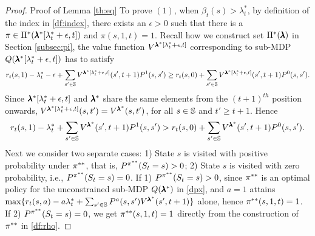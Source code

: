 \section{}\label{ap:eq}
\begin{proof}{Proof of Lemma \ref{th:eq}}
To prove $(1)$, when $\beta_t(s)>\lambda^*_t$, by definition of the index in \eqref{df:index}, there exists an $\epsilon>0$ such that there is a $\pi\in\Pi^{*}(\pmb{\lambda}^*[\lambda_t^*+\epsilon,t])$ and $\pi(s,1,t)=1$. Recall how we construct set $\Pi^*(\pmb{\lambda})$ in Section \ref{subsec:pi}, the value function $V^{\pmb{\lambda}^*[\lambda^*_t+\epsilon,t]}$ corresponding to sub-MDP $Q(\pmb{\lambda}^*[\lambda^*_t+\epsilon,t])$ has to satisfy
\begin{equation*}
r_t(s,1)-\lambda^*_t-\epsilon+\sum_{s'\in\mathbb{S}}V^{\pmb{\lambda}^*[\lambda^*_t+\epsilon,t]}(s',t+1)P^1(s,s')\geq r_t(s,0)+\sum_{s'\in\mathbb{S}}V^{\pmb{\lambda}^*[\lambda^*_t+\epsilon,t]}(s',t+1)P^0(s,s').
\end{equation*}
Since $\pmb{\lambda}^*[\lambda^*_t+\epsilon,t]$ and $\pmb{\lambda}^*$ share the same elements from the $(t+1)^{th}$ position onwards, $V^{\pmb{\lambda}^*[\lambda^*_t+\epsilon,t]}(s,t') = V^{\pmb{\lambda}^*}(s,t')$, for all $s\in\mathbb{S}$ and $t'\geq t+1$. Hence
\begin{equation}\label{fp}
r_t(s,1)-\lambda^*_t+\sum_{s'\in\mathbb{S}}V^{\pmb{\lambda}^*}(s',t+1)P^1(s,s')> r_t(s,0)+\sum_{s'\in\mathbb{S}}V^{\pmb{\lambda}^*}(s',t+1)P^0(s,s').
\end{equation}
Next we consider two separate cases: 1) State $s$ is visited with positive probability under $\pi^{**}$, that is, $P^{\pi^{**}}(S_t=s)>0$; 2) State $s$ is visited with zero probability, i.e., $P^{\pi^{**}}(S_t=s)=0$. If 1) $P^{\pi^{**}}(S_t=s)>0$, since $\pi^{**}$ is an optimal policy for the unconstrained sub-MDP $Q(\pmb{\lambda}^*)$ in \eqref{dpx}, and $a=1$ attains $\max\{r_t(s,a)-a\lambda_t^*+\sum_{s'\in\mathbb{S}}P^{a}(s,s')V^{\pmb{\lambda}^*}(s',t+1)\}$ alone, hence $\pi^{**}(s,1,t)=1$. If 2) $P^{\pi^{**}}(S_t=s)=0$, we get $\pi^{**}(s,1,t)=1$ directly from the construction of $\pi^{**}$ in \eqref{df:rho}. 


\end{proof}
